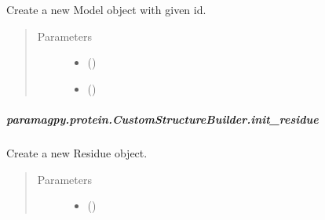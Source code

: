 \documentclass[a4paper,10pt,english,openany,oneside]{sphinxmanual}
\begin{document}
\begin{fulllineitems}
\begin{fulllineitems}
\begin{fulllineitems}
\label{\detokenize{reference/generated/paramagpy.protein.CustomStructureBuilder.init_model:paramagpy.protein.CustomStructureBuilder.init_model}}
Create a new Model object with given id.
\begin{quote}\begin{description}
\item[{Parameters}] \leavevmode\begin{itemize}
\item {} 
 (\sphinxstyleliteralemphasis{\sphinxupquote{-}}) \textendash{} 

\item {} 
 (\sphinxstyleliteralemphasis{\sphinxupquote{-}}) \textendash{} 

\end{itemize}

\end{description}\end{quote}

\end{fulllineitems}



\subparagraph{paramagpy.protein.CustomStructureBuilder.init\_residue}
\label{\detokenize{reference/generated/paramagpy.protein.CustomStructureBuilder.init_residue:paramagpy-protein-customstructurebuilder-init-residue}}\label{\detokenize{reference/generated/paramagpy.protein.CustomStructureBuilder.init_residue::doc}}

\begin{fulllineitems}
\label{\detokenize{reference/generated/paramagpy.protein.CustomStructureBuilder.init_residue:paramagpy.protein.CustomStructureBuilder.init_residue}}
Create a new Residue object.
\begin{quote}\begin{description}
\item[{Parameters}] \leavevmode\begin{itemize}
\item {} 
\sphinxstyleliteralstrong{\sphinxupquote{, }} (\sphinxstyleliteralemphasis{\sphinxupquote{-}}) \textendash{} 


\end{itemize}
\end{description}
\end{quote}
\end{fulllineitems}
\end{fulllineitems}
\end{fulllineitems}
\end{document}
